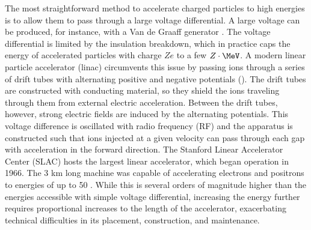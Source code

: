 The most straightforward method to accelerate charged particles to high energies is to allow them to pass through a large voltage differential.
A large voltage can be produced, for instance, with a Van de Graaff generator \cite{PhysRev.43.149}.
The voltage differential is limited by the insulation breakdown, which in practice caps the energy of accelerated particles with charge $Ze$ to a few $Z \cdot\MeV$.
A modern linear particle accelerator (linac) circumvents this issue by passing ions through a series of drift tubes with alternating positive and negative potentials (\Fig{\ref{fig:linac}}).
The drift tubes are constructed with conducting material, so they shield the ions traveling through them from external electric acceleration.
Between the drift tubes, however, strong electric fields are induced by the alternating potentials.
This voltage difference is oscillated with radio frequency (RF) and the apparatus is constructed such that ions injected at a given velocity can pass through each gap with acceleration in the forward direction.
The Stanford Linear Accelerator Center (SLAC) hosts the largest linear accelerator, which began operation in 1966.
The 3 km long machine was capable of accelerating electrons and positrons to energies of up to 50 \GeV.
While this is several orders of magnitude higher than the energies accessible with simple voltage differential, increasing the energy further requires proportional increases to the length of the accelerator, exacerbating technical difficulties in its placement, construction, and maintenance.

